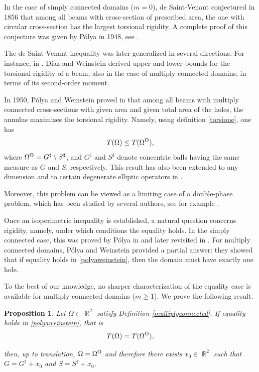 \documentclass[oneside,a4paper,11pt,notitlepage]{article}
\theoremstyle{definition}
\theoremstyle{plain}
\newtheorem{prop}[theorem]{Proposition}
\theoremstyle{definition}
\DeclareMathOperator{\R}{\mathbb{R}}
\newcommand{\OO}{\text{\normalfont  O}}
\begin{document}
In the case of simply connected domains ($m=0$), de Saint-Venant conjectured in 1856 that among all beams with cross-section of prescribed area, the one with circular cross-section has the largest torsional rigidity. A complete proof of this conjecture was given by Pólya in 1948, see \cite{P}.

The de Saint-Venant inequality was later generalized in several directions. For instance, in \cite{DW}, Díaz and Weinstein derived upper and lower bounds for the torsional rigidity of a beam, also in the case of multiply connected domains, in terms of its second-order moment.

In 1950, Pólya and Weinstein proved in \cite{PW} that among all beams with multiply connected cross-sections with given area and given total area of the holes, the annulus maximizes the torsional rigidity. Namely, using definition \eqref{torsione}, one has
\begin{equation}\label{polyaweinstein}
    T(\Omega) \leq T(\Omega^\OO),
\end{equation}
where $\Omega^\OO = G^\sharp \setminus S^\sharp$, and $G^\sharp$ and $S^\sharp$ denote concentric balls having the same measure as $G$ and $S$, respectively. This result has also been extended to any dimension and to certain degenerate elliptic operators in \cite{B,CH}.

Moreover, this problem can be viewed as a limiting case of a double-phase problem, which has been studied by several authors, see for example \cite{CLM,CMS,MNP}.

Once an isoperimetric inequality is established, a natural question concerns rigidity, namely, under which conditions the equality holds. In the simply connected case, this was proved by Pólya in \cite{P} and later revisited in \cite{BM}. For multiply connected domains, Pólya and Weinstein provided a partial answer: they showed that if equality holds in \eqref{polyaweinstein}, then the domain must have exactly one hole.

To the best of our knowledge, no sharper characterization of the equality case is available for multiply connected domains ($m \geq 1$). We prove the following result.

\begin{prop}\label{propmerc}
    Let $\Omega\subset\R^2$ satisfy Definition \ref{multiplyconnected}. If equality holds in \eqref{polyaweinstein}, that is
    \[T(\Omega)=T(\Omega^\OO),\]

     then, up to translation, $\Omega=\Omega^\OO$ and therefore there exists $x_0 \in \R^2$ such that $G=G^\sharp+ x_0$ and $S=S^\sharp+ x_0$.
\end{prop}
\end{document}
